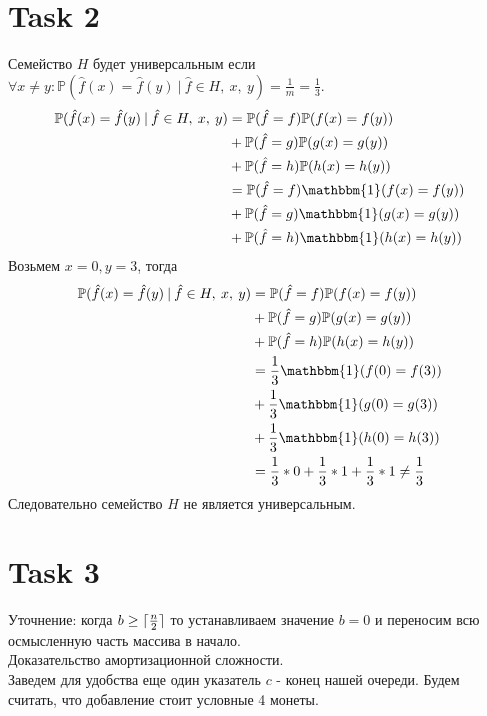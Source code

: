 \documentclass[12pt]{exam}
\DeclarePairedDelimiter\ceil{\lceil}{\rceil}
\begin{document}
\section*{Task 2}
Семейство $H$ будет универсальным 
если $\forall x \neq y: \mathbb{P}(\hat{f}(x) = \hat{f}(y) \: | \: \hat{f} \in H,\: x,\: y) = \frac{1}{m} = \frac{1}{3}$.
\begin{align*}
    \mathbb{P}(\hat{f}(x) = \hat{f}(y) \: | \: \hat{f} \in H,\: x,\: y) 
        &= \mathbb{P}(\hat{f} = f) \mathbb{P}(f(x) = f(y)) \\
        &+ \mathbb{P}(\hat{f} = g) \mathbb{P}(g(x) = g(y)) \\
        &+ \mathbb{P}(\hat{f} = h) \mathbb{P}(h(x) = h(y)) \\
        &= \mathbb{P}(\hat{f} = f) \mathbbm{1}(f(x) = f(y)) \\
        &+ \mathbb{P}(\hat{f} = g) \mathbbm{1}(g(x) = g(y)) \\
        &+ \mathbb{P}(\hat{f} = h) \mathbbm{1}(h(x) = h(y)) 
\end{align*}
Возьмем $x=0, y=3$, тогда 
\begin{align*}
    \mathbb{P}(\hat{f}(x) = \hat{f}(y) \: | \: \hat{f} \in H,\: x,\: y) 
        &= \mathbb{P}(\hat{f} = f) \mathbb{P}(f(x) = f(y)) \\
        &+ \mathbb{P}(\hat{f} = g) \mathbb{P}(g(x) = g(y)) \\
        &+ \mathbb{P}(\hat{f} = h) \mathbb{P}(h(x) = h(y)) \\
        &= \frac{1}{3} \mathbbm{1}(f(0) = f(3)) \\
        &+ \frac{1}{3} \mathbbm{1}(g(0) = g(3)) \\
        &+ \frac{1}{3} \mathbbm{1}(h(0) = h(3)) \\
        &= \frac{1}{3} * 0 + \frac{1}{3} * 1 + \frac{1}{3} * 1 \neq \frac{1}{3}
\end{align*}
Следовательно семейство $H$ не является универсальным.

\section*{Task 3}
Уточнение: когда $b \geq \ceil{\frac{n}{2}}$ то устанавливаем значение $b=0$ 
и переносим всю осмысленную часть массива в начало. \\
Доказательство амортизационной сложности.\\
Заведем для удобства еще один указатель $c$ - конец нашей очереди.
Будем считать, что добавление стоит условные 4 монеты. 
\end{document}
